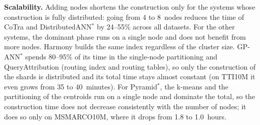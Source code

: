 \textbf{Scalability.} Adding nodes shortens the construction only for the systems
whose construction is fully distributed: going from 4 to 8~nodes reduces the
time of CoTra and DistributedANN$^{*}$ by 24--55\% across all datasets. For the
other systems, the dominant phase runs on a single node and does not benefit from
more nodes. Harmony builds the same index regardless of the cluster size.
GP-ANN$^{*}$ spends 80--95\% of its time in the single-node partitioning and
QueryAttribution (routing index and routing tables), so only the construction of
the shards is distributed and its total time stays almost constant (on TTI10M it
even grows from 35 to 40~minutes). For
Pyramid$^{*}$, the k-means and the partitioning of the centroids run on a single
node and dominate the total, so the construction time does not decrease
consistently with the number of nodes; it does so only on MSMARCO10M, where it
drops from 1.8 to 1.0~hours.
